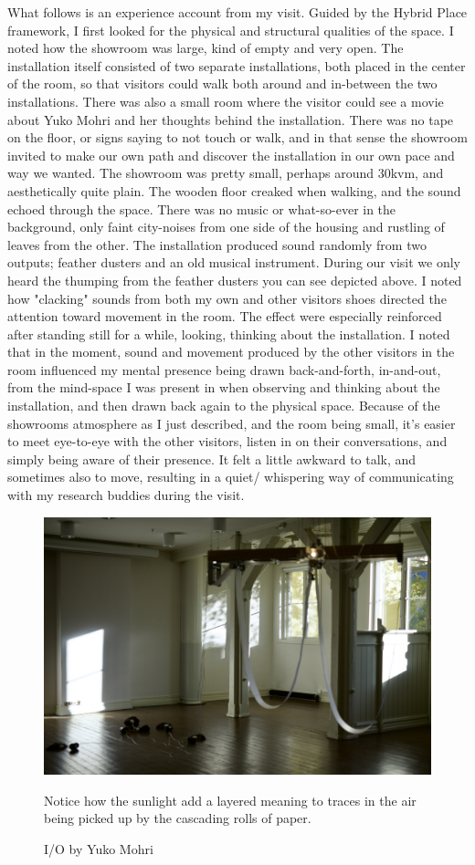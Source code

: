 What follows is an experience account from my visit. Guided by the Hybrid Place framework, I first looked for the physical and structural qualities of the space. I noted how the showroom was large, kind of empty and very open. The installation itself consisted of two separate installations, both placed in the center of the room, so that visitors could walk both around and in-between the two installations. There was also a small room where the visitor could see a movie about Yuko Mohri and her thoughts behind the installation. There was no tape on the floor, or signs saying to not touch or walk, and in that sense the showroom invited to make our own path and discover the installation in our own pace and way we wanted. The showroom was pretty small, perhaps around 30kvm, and aesthetically quite plain. The wooden floor creaked when walking, and the sound echoed through the space. There was no music or what-so-ever in the background, only faint city-noises from one side of the housing and rustling of leaves from the other. The installation produced sound randomly from two outputs; feather dusters and an old musical instrument. During our visit we only heard the thumping from the feather dusters you can see depicted above. I noted how "clacking" sounds from both my own and other visitors shoes directed the attention toward movement in the room. The effect were especially reinforced after standing still for a while, looking, thinking about the installation. I noted that in the moment, sound and movement produced by the other visitors in the room influenced my mental presence being drawn back-and-forth, in-and-out, from the mind-space I was present in when observing and thinking about the installation, and then drawn back again to the physical space. Because of the showrooms atmosphere as I just described, and the room being small, it's easier to meet eye-to-eye with the other visitors, listen in on their conversations, and simply being aware of their presence. It felt a little awkward to talk, and sometimes also to move, resulting in a quiet/ whispering way of communicating with my research buddies during the visit.

\begin{figure}[H]
    \centering 
    \includegraphics[width=12cm]{pictures/process/yuko_harmony.jpeg}
    \caption{I/O by Yuko Mohri}{Notice how the sunlight add a layered meaning to traces in the air being picked up by the cascading rolls of paper.}
\end{figure}

